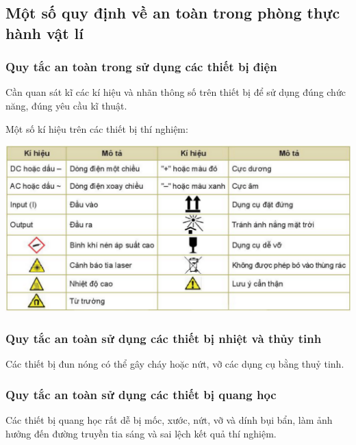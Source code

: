 \subsection{Một số quy định về an toàn trong phòng thực hành vật lí}
\subsubsection{Quy tắc an toàn trong sử dụng các thiết bị điện}
Cần quan sát kĩ các kí hiệu và nhãn thông số trên thiết bị để sử dụng đúng chức năng, đúng yêu cầu kĩ thuật.

Một số kí hiệu trên các thiết bị thí nghiệm:
\begin{center}
	\includegraphics[scale=0.7]{../figs/G10-2-1}
\end{center}
\subsubsection{Quy tắc an toàn sử dụng các thiết bị nhiệt và thủy tinh}
Các thiết bị đun nóng có thể gây cháy hoặc nứt, vỡ các dụng cụ bằng thuỷ tinh.
\subsubsection{Quy tắc an toàn sử dụng các thiết bị quang học}
Các thiết bị quang học rất dễ bị mốc, xước, nứt, vỡ và dính bụi bẩn, làm ảnh hưởng đến đường truyền tia sáng và sai lệch kết quả thí nghiệm.
